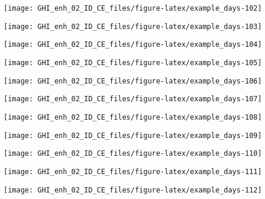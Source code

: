 \documentclass[
  10pt,
  a4paper,oneside]{article}
\begin{document}
\begin{center}\texttt{[image: GHI\_enh\_02\_ID\_CE\_files/figure-latex/example\_days-102]} \end{center}

\begin{center}\texttt{[image: GHI\_enh\_02\_ID\_CE\_files/figure-latex/example\_days-103]} \end{center}

\begin{center}\texttt{[image: GHI\_enh\_02\_ID\_CE\_files/figure-latex/example\_days-104]} \end{center}

\begin{center}\texttt{[image: GHI\_enh\_02\_ID\_CE\_files/figure-latex/example\_days-105]} \end{center}

\begin{center}\texttt{[image: GHI\_enh\_02\_ID\_CE\_files/figure-latex/example\_days-106]} \end{center}

\begin{center}\texttt{[image: GHI\_enh\_02\_ID\_CE\_files/figure-latex/example\_days-107]} \end{center}

\begin{center}\texttt{[image: GHI\_enh\_02\_ID\_CE\_files/figure-latex/example\_days-108]} \end{center}

\begin{center}\texttt{[image: GHI\_enh\_02\_ID\_CE\_files/figure-latex/example\_days-109]} \end{center}

\begin{center}\texttt{[image: GHI\_enh\_02\_ID\_CE\_files/figure-latex/example\_days-110]} \end{center}

\begin{center}\texttt{[image: GHI\_enh\_02\_ID\_CE\_files/figure-latex/example\_days-111]} \end{center}

\begin{center}\texttt{[image: GHI\_enh\_02\_ID\_CE\_files/figure-latex/example\_days-112]} \end{center}
\end{document}
